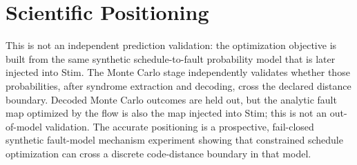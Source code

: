 \documentclass[11pt]{article}
\begin{document}
\section{Scientific Positioning}
This is not an independent prediction validation: the optimization objective is
built from the same synthetic schedule-to-fault probability model that is later
injected into Stim. The Monte Carlo stage independently validates whether those
probabilities, after syndrome extraction and decoding, cross the declared
distance boundary. Decoded Monte Carlo outcomes are held out, but the analytic
fault map optimized by the flow is also the map injected into Stim; this is not
an out-of-model validation. The accurate positioning is a prospective,
fail-closed synthetic fault-model mechanism experiment showing that constrained
schedule optimization can cross a discrete code-distance boundary in that
model.
\end{document}
